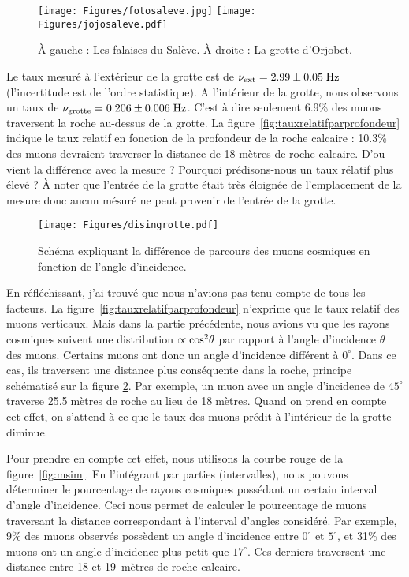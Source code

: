 \documentclass[a4paper, 12pt]{article}
\begin{document}
\begin{spacing}{1.5}
\begin{figure}[t]
\begin{center}
  \texttt{[image: Figures/fotosaleve.jpg]}
  \texttt{[image: Figures/jojosaleve.pdf]}
\caption{\label{fig:GrotteOrjobet} À gauche : Les falaises du Salève. À droite : La grotte d'Orjobet.}
\end{center}
\end{figure}

Le taux mesuré à l'extérieur de la grotte est de $\nu_{\rm ext}=2.99\pm0.05\;{\rm Hz}$ (l'incertitude est de l'ordre statistique). A l'intérieur de la grotte, nous observons un taux de $\nu_{\rm grotte}=0.206\pm0.006\;{\rm Hz}$. C'est à dire seulement 6.9\% des muons traversent la roche au-dessus de la grotte. La figure~\ref{fig:tauxrelatifparprofondeur} indique le taux relatif en fonction de la profondeur de la roche calcaire : 10.3\% des muons devraient traverser la distance de 18 mètres de roche calcaire. D'ou vient la différence avec la mesure ? Pourquoi prédisons-nous un taux rélatif plus élevé ? À noter que l'entrée de la grotte était très éloignée de l'emplacement de la mesure donc aucun mésuré ne peut provenir de l'entrée de la grotte.

\begin{figure}[t]
\begin{center}
\texttt{[image: Figures/disingrotte.pdf]}
\caption{\label{fig:disingrotte} Schéma expliquant la différence de parcours des muons cosmiques en fonction de l'angle d'incidence.}
\end{center}
\end{figure}
En réfléchissant, j'ai trouvé que nous n'avions pas tenu compte de tous les facteurs. La figure~\ref{fig:tauxrelatifparprofondeur} n'exprime que le taux relatif des muons verticaux. Mais dans la partie précédente, nous avions vu que les rayons cosmiques suivent une distribution $\propto {\rm cos}^2\theta$ par rapport à l'angle d'incidence $\theta$ des muons.  Certains muons ont donc un angle d'incidence différent à $0^{\circ}$. Dans ce cas, ils traversent une distance plus conséquente dans la roche, principe schématisé sur la figure \ref{fig:disingrotte}. Par exemple, un muon avec un angle d'incidence de $45^\circ$ traverse 25.5$\;$mètres de roche au lieu de 18$\;$mètres. Quand on prend en compte cet effet, on s'attend à ce que le taux des muons prédit à l'intérieur de la grotte diminue. 

Pour prendre en compte cet effet, nous utilisons la courbe rouge de la figure~\ref{fig:msim}. En l'intégrant par parties (intervalles), nous pouvons déterminer le pourcentage de rayons cosmiques possédant un certain interval d'angle d'incidence. Ceci nous permet de calculer le pourcentage de muons traversant la distance correspondant à l'interval d'angles considéré. Par exemple, 9\% des muons observés possèdent un angle d'incidence entre $0^\circ$ et $5^\circ$, et 31\% des muons ont un angle d'incidence plus petit que $17^\circ$. Ces derniers traversent une distance entre 18 et 19~mètres de roche calcaire. 


\end{spacing}
\end{document}
